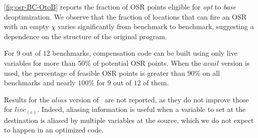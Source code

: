 \myfigure\ref{fig:osr-BC-OtoB} reports the fraction of OSR points eligible for {\em opt} to {\em base} deoptimization. We observe that the fraction of locations that can fire an OSR with an empty $\chi$ varies significantly from benchmark to benchmark, suggesting a dependence on the structure of the original program.

For $9$ out of $12$ benchmarks, compensation code can be built using only live variables for more than $50\%$ of potential OSR points.
When the $avail$ version is used, the percentage of feasible OSR points is greater than $90\%$ on all benchmarks and nearly $100\%$ for $9$ out of $12$ of them.

\noindent Results for the $alias$ version of \reconstruct\ are not reported, as they do not improve those for $live_{(e)}$. Indeed, aliasing information is useful when a variable to set at the destination is aliased by multiple variables at the source, which we do not expect to happen in an optimized code.

